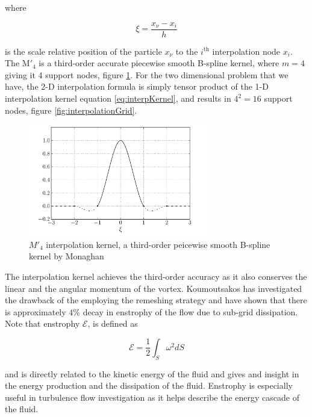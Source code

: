 where 

	\begin{equation}
	\xi = \frac{x_{\nu} - x_i}{h}
	\label{eq:xiEquation}
	\end{equation}

is the scale relative position of the particle $x_{\nu}$ to the $i^{\mathrm{th}}$ interpolation node $x_i$. The $\mathrm{M'}_4$ is a third-order accurate piecewise smooth B-spline kernel, where $m = 4$ giving it 4 support nodes, figure \ref{fig:interpolationKernel}. For the two dimensional problem that we have, the 2-D interpolation formula is simply tensor product of the 1-D interpolation kernel equation \ref{eq:interpKernel}, and results in $4^2 = 16$ support nodes, figure \ref{fig:interpolationGrid}.

	\begin{figure}[t]
	\centering
	\includegraphics[width=0.7\textwidth]{figures/lagrangian/interpolationKernel.pdf}
	\caption{$M'_4$ interpolation kernel, a third-order peicewise smooth B-spline kernel by Monaghan \cite{Monaghan1985}}
	\label{fig:interpolationKernel}
	\end{figure}

The interpolation kernel achieves the third-order accuracy as it also conserves the linear and the angular momentum of the vortex. Koumoutsakos \cite{Koumoutsakos1997} has investigated the drawback of the employing the remeshing strategy and have shown that there is approximately $4\%$ decay in enstrophy of the flow due to sub-grid dissipation. Note that enstrophy $ \mathcal{E}$, is defined as


	\begin{equation}
	\mathcal{E} = \frac{1}{2}\int_S \omega^2 dS
	\end{equation}
	
and is directly related to the kinetic energy of the fluid and gives and insight in the energy production and the dissipation of the fluid. Enstrophy is especially useful in turbulence flow investigation as it helps describe the energy cascade of the fluid.		

